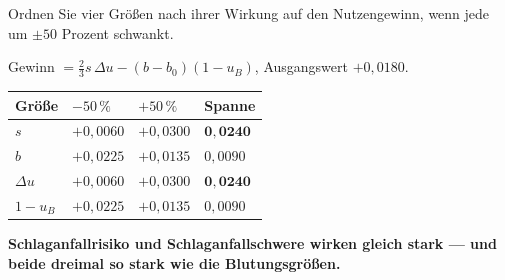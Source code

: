 \begin{aufgabe}
Ordnen Sie vier Größen nach ihrer Wirkung auf den Nutzengewinn, wenn jede um $\pm50$ Prozent schwankt.

\loesung
{}
Gewinn $= \tfrac23 s\,\Delta u - (b-b_0)(1-u_B)$, Ausgangswert $+0{,}0180$.

\begin{center}
{\small
\renewcommand{\arraystretch}{1.46}
\begin{tabular}{@{}P{2.4cm}P{1.8cm}P{1.8cm}P{2.0cm}@{}}
\toprule
\textbf{Größe} & $-50\,\%$ & $+50\,\%$ & \textbf{Spanne}\\
\midrule
$s$ & $+0{,}0060$ & $+0{,}0300$ & $\mathbf{0{,}0240}$\\
$b$ & $+0{,}0225$ & $+0{,}0135$ & $0{,}0090$\\
$\Delta u$ & $+0{,}0060$ & $+0{,}0300$ & $\mathbf{0{,}0240}$\\
$1-u_B$ & $+0{,}0225$ & $+0{,}0135$ & $0{,}0090$\\
\bottomrule
\end{tabular}}
\end{center}

\begin{center}
\begin{minipage}{0.9\textwidth}
\textbf{Schlaganfallrisiko und Schlaganfallschwere wirken gleich stark --- und beide dreimal so stark wie die Blutungsgrößen.}
\end{minipage}
\end{center}

\begin{center}
\begin{minipage}{0.88\textwidth}
\end{minipage}
\end{center}
\end{aufgabe}

